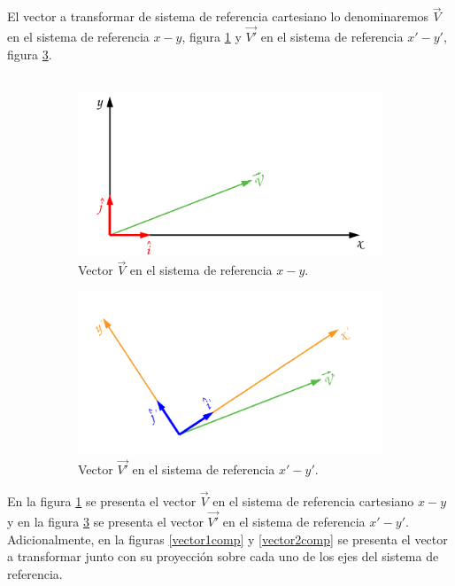 \documentclass[12pt,letterpaper]{article}
\begin{document}
%
%
El vector a transformar de sistema de referencia cartesiano lo denominaremos $\overset{\rightarrow}{V}$ en el sistema de referencia $x-y$, figura \ref{vector1} y $\overset{\rightarrow}{V'}$ en el sistema de referencia $x'-y'$, figura \ref{vector2}.\\\\
%
%
\begin{figure}[h]
	\centering
	\begin{subfigure}[l]{0.45\textwidth}
		\includegraphics[width=\textwidth]{img/Vector1.pdf}
		\caption{Vector $\overset{\rightarrow}{V}$ en el sistema de referencia $x-y$.}
		\label{vector1}
	\end{subfigure}
	\hspace{.5 cm}
	\begin{subfigure}[r]{0.45\textwidth}
		\includegraphics[width=\textwidth]{img/Vector2.pdf}
		\caption{Vector $\overset{\rightarrow}{V'}$ en el sistema de referencia $x'-y'$.}
		\label{vector2}
	\end{subfigure}	
	\caption{}
\end{figure}
%

En la figura \ref{vector1} se presenta el vector $\overset{\rightarrow}{V}$ en el sistema de referencia cartesiano $x-y$ y en la figura \ref{vector2} se presenta el vector $\overset{\rightarrow}{V'}$ en el sistema de referencia $x'-y'$. Adicionalmente, en la figuras \ref{vector1comp} y \ref{vector2comp} se presenta el vector a transformar junto con su proyección sobre cada uno de los ejes del sistema de referencia.\\\\
\end{document}
